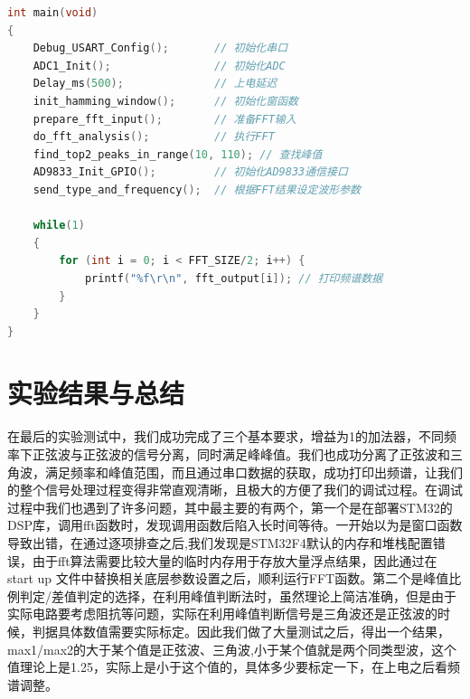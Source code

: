 \documentclass{article}
\begin{document}
\begin{lstlisting}[language=C, caption=main.c 主程序文件]
int main(void)
{
    Debug_USART_Config();       // 初始化串口
    ADC1_Init();                // 初始化ADC
    Delay_ms(500);              // 上电延迟
    init_hamming_window();      // 初始化窗函数
    prepare_fft_input();        // 准备FFT输入
    do_fft_analysis();          // 执行FFT
    find_top2_peaks_in_range(10, 110); // 查找峰值
    AD9833_Init_GPIO();         // 初始化AD9833通信接口
    send_type_and_frequency();  // 根据FFT结果设定波形参数

    while(1)
    {
        for (int i = 0; i < FFT_SIZE/2; i++) {
            printf("%f\r\n", fft_output[i]); // 打印频谱数据
        }
    }
}
\end{lstlisting}

\section{实验结果与总结}
在最后的实验测试中，我们成功完成了三个基本要求，增益为1的加法器，不同频率下正弦波与正弦波的信号分离，同时满足峰峰值。我们也成功分离了正弦波和三角波，满足频率和峰值范围，而且通过串口数据的获取，成功打印出频谱，让我们的整个信号处理过程变得非常直观清晰，且极大的方便了我们的调试过程。在调试过程中我们也遇到了许多问题，其中最主要的有两个，第一个是在部署STM32的DSP库，调用fft函数时，发现调用函数后陷入长时间等待。一开始以为是窗口函数导致出错，在通过逐项排查之后,我们发现是STM32F4默认的内存和堆栈配置错误，由于fft算法需要比较大量的临时内存用于存放大量浮点结果，因此通过在start up 文件中替换相关底层参数设置之后，顺利运行FFT函数。第二个是峰值比例判定/差值判定的选择，在利用峰值判断法时，虽然理论上简洁准确，但是由于实际电路要考虑阻抗等问题，实际在利用峰值判断信号是三角波还是正弦波的时候，判据具体数值需要实际标定。因此我们做了大量测试之后，得出一个结果，max1/max2的大于某个值是正弦波、三角波,小于某个值就是两个同类型波，这个值理论上是1.25，实际上是小于这个值的，具体多少要标定一下，在上电之后看频谱调整。
\end{document}
